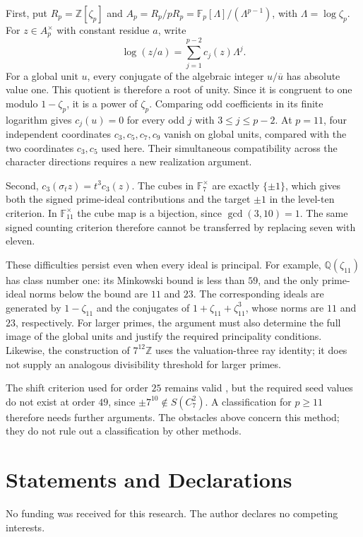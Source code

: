 \documentclass[11pt]{amsart}
\theoremstyle{plain}
\theoremstyle{definition}
\numberwithin{equation}{section}
\newcommand{\Z}{\mathbb Z}
\newcommand{\Q}{\mathbb Q}
\newcommand{\F}{\mathbb F}
\begin{document}
First, put $R_p=\Z[\zeta_p]$ and
$A_p=R_p/pR_p=\F_p[\Lambda]/(\Lambda^{p-1})$, with
$\Lambda=\log\zeta_p$. For $z\in A_p^\times$ with constant residue
$a$, write
\[
 \log(z/a)=\sum_{j=1}^{p-2}c_j(z)\Lambda^j.
\]
For a global unit $u$, every conjugate of the algebraic integer
$u/\overline u$ has absolute value one. This quotient is therefore a
root of unity. Since it is congruent to one modulo $1-\zeta_p$, it
is a power of $\zeta_p$. Comparing odd coefficients in its finite
logarithm gives $c_j(u)=0$ for every odd $j$ with $3\le j\le p-2$.
At $p=11$, four independent coordinates
$c_3,c_5,c_7,c_9$ vanish on global units, compared with the two
coordinates $c_3,c_5$ used here. Their simultaneous compatibility
across the character directions requires a new realization argument.

Second, $c_3(\sigma_tz)=t^3c_3(z)$. The cubes in $\F_7^\times$ are
exactly $\{\pm1\}$, which gives both the signed prime-ideal contributions
and the target $\pm1$ in the level-ten criterion. In $\F_{11}^\times$
the cube map is a bijection, since $\gcd(3,10)=1$. The same signed
counting criterion therefore cannot be transferred by replacing
seven with eleven.

These difficulties persist even when every ideal is principal.
For example, $\Q(\zeta_{11})$ has class number one: its Minkowski
bound is less than $59$, and the only prime-ideal norms below the
bound are $11$ and $23$. The corresponding ideals are generated by
$1-\zeta_{11}$ and the conjugates of $1+\zeta_{11}+\zeta_{11}^3$,
whose norms are $11$ and $23$, respectively.
For larger primes, the argument must also determine the full image
of the global units and justify the required principality conditions.
Likewise, the construction of $7^{12}\Z$ uses the valuation-three
ray identity; it does not supply an analogous divisibility threshold
for larger primes.

The shift criterion used for order $25$ remains valid
\cite[Proposition~2.2]{Panraksa2026}, but the required seed values
do not exist at order $49$, since $\pm7^{10}\notin S(C_7^2)$.
A classification for $p\ge11$ therefore needs further arguments.
The obstacles above concern this method; they do not rule out a
classification by other methods.


\section*{Statements and Declarations}
No funding was received for this research. The author declares no
competing interests.
\end{document}

